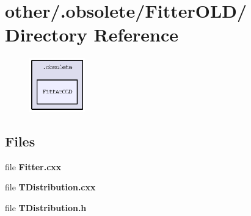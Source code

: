 \section{other/.obsolete/Fitter\-OLD/ Directory Reference}
\label{dir_1f5ba7abd354d166a1f3aceb553de1ec}


\begin{figure}[H]
\begin{center}
\leavevmode
\includegraphics[width=68pt]{dir_1f5ba7abd354d166a1f3aceb553de1ec_dep}
\end{center}
\end{figure}
\subsection*{Files}
\begin{CompactItemize}
\item 
file \textbf{Fitter.cxx}
\item 
file \textbf{TDistribution.cxx}
\item 
file \textbf{TDistribution.h}
\end{CompactItemize}
